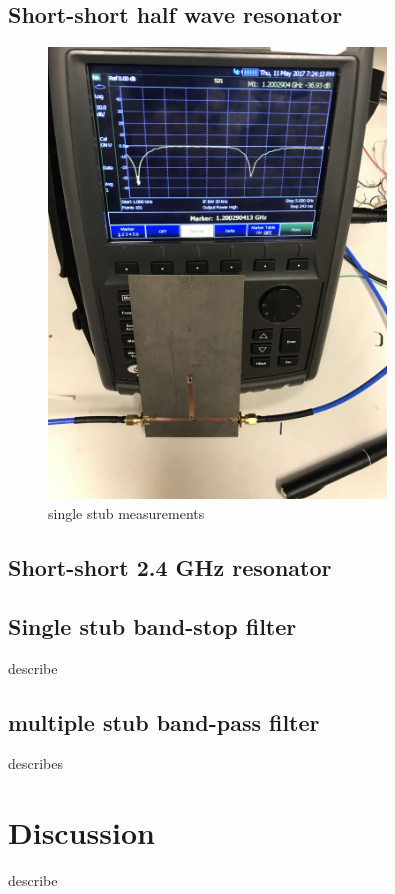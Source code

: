 \documentclass[letterpaper, 12pt]{article}
\begin{document}
\subsection{Short-short half wave resonator}
\begin{figure}
    \centering
    \includegraphics[width=0.8\textwidth, angle=270]{1stub}
    \caption {single stub measurements}
\end{figure}
\subsection{Short-short 2.4 GHz resonator}


\subsection{Single stub band-stop filter}
describe
\subsection{multiple stub band-pass filter}
describes

\section{Discussion}
describe
\end{document}

